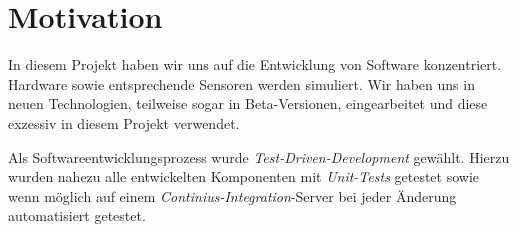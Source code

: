 \section{Motivation}

In diesem Projekt haben wir uns auf die Entwicklung von Software konzentriert.
	Hardware sowie entsprechende Sensoren werden simuliert. Wir haben uns in
	neuen Technologien, teilweise sogar in Beta-Versionen, eingearbeitet und 
	diese exzessiv in diesem Projekt verwendet.

Als Softwareentwicklungsprozess wurde \emph{Test-Driven-Development} gewählt.
	Hierzu wurden nahezu alle entwickelten Komponenten mit \emph{Unit-Tests}
	getestet sowie wenn möglich auf einem \emph{Continius-Integration}-Server
	bei jeder Änderung automatisiert getestet.